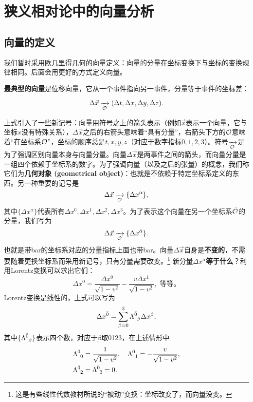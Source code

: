 \chapter{狭义相对论中的向量分析}
\label{chap2}

\section{向量的定义}
\label{sec2.1}
我们暂时采用欧几里得几何的向量定义：向量的分量在坐标变换下与坐标的变换规律相同。后面会用更好的方式定义向量。

\textbf{最典型的向量}是位移向量，它从一个事件指向另一事件，分量等于事件的坐标差：
\begin{shaded}
\begin{equation}
    \Delta \vec{x} \xrightarrow[\mathcal{O}]{ } (\Delta t, \Delta x, \Delta y, \Delta z).
\label{equ2.1}
\end{equation}
\end{shaded}
上式引入了一些新记号：向量用符号之上的箭头表示（例如$\vec{x}$表示一个向量，它与坐标$x$没有特殊关系），$\Delta \vec{x}$之后的右箭头意味着“具有分量”，右箭头下方的$\mathcal{O}$意味着“在坐标系$\mathcal{O}$”，坐标的顺序总是$t, x, y, z$（对应于数字指标$0, 1, 2, 3$）。符号$\xrightarrow[\mathcal{O}]{ }$是为了强调区别向量本身与向量分量。向量$\Delta \vec{x}$是两事件之间的箭头，而向量分量是一组四个依赖于坐标系的数字。为了强调向量（以及之后的张量）的概念，我们称它们为\textbf{几何对象 (geometrical object)}：也就是不依赖于特定坐标系定义的东西。另一种重要的记号是
\begin{equation}
    \Delta \vec{x} \xrightarrow[\mathcal{O}]{ } \{ \Delta x^\alpha \},
\label{equ2.2}
\end{equation}
其中$\{ \Delta x^\alpha \}$代表所有$\Delta x^0, \Delta x^1, \Delta x^2, \Delta x^3$。为了表示这个向量在另一个坐标系$\bar{\mathcal{O}}$的分量，我们写为
\[
    \Delta \vec{x} \xrightarrow[\mathcal{O}]{ }  \{\Delta x^{\bar{\alpha}} \}.
\]
也就是带bar的坐标系对应的分量指标上面也带bar。向量$\Delta \vec{x}$自身是\textbf{不变的}，不需要随着更换坐标系而采用新记号，只有分量需要改变。\footnote{这是有些线性代数教材所说的“被动”变换：坐标改变了，而向量没变。} 新分量$\Delta x^{\bar{\alpha}}$\textbf{等于什么}？利用Lorentz变换可以求出它们：
\[
    \Delta x^{\bar{0}} = \frac{\Delta x^0}{\sqrt{1 - v^2}} - \frac{v \Delta x^1}{\sqrt{1 - v^2}}, \text{\ 等等。}
\]
Lorentz变换是线性的，上式可以写为
\[
    \Delta x^{\bar{0}} = \sum_{\beta = 0}^3 \Lambda\indices{^{\bar{0}}_\beta} \Delta x^{\beta},
\]
其中$\{ \Lambda\indices{^{\bar{0}}_\beta} \}$表示四个数，对应于$\beta$取0123，在上述情形中
\begin{align*}
    \Lambda\indices{^{\bar{0}}_0} &= \frac{1}{\sqrt{1 - v^2}}, \quad \Lambda\indices{^{\bar{0}}_1} = -\frac{v}{\sqrt{1 - v^2}}, \\
    \Lambda\indices{^{\bar{0}}_2} &= \Lambda\indices{^{\bar{0}}_3} = 0.
\end{align*}
